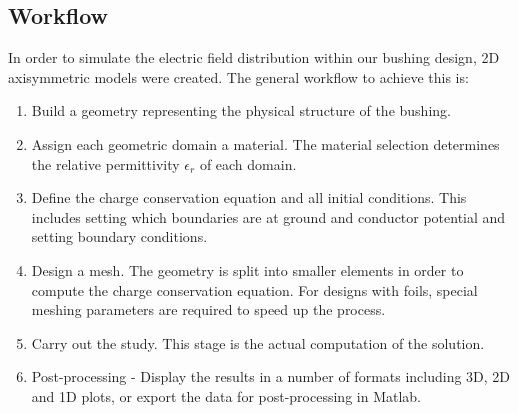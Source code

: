 \subsection{Workflow}
In order to simulate the electric field distribution within our bushing design, 2D axisymmetric models were created. The general workflow to achieve this is:
\begin{enumerate}
\item Build a geometry representing the physical structure of the bushing.
\item Assign each geometric domain a material. The material selection determines the relative permittivity $\epsilon_r$ of each domain.
\item Define the charge conservation equation and all initial conditions. This includes setting which boundaries are at ground and conductor potential and setting boundary conditions.
\item Design a mesh. The geometry is split into smaller elements in order to compute the charge conservation equation. For designs with foils, special meshing parameters are required to speed up the process.
\item Carry out the study. This stage is the actual computation of the solution.
\item Post-processing - Display the results in a number of formats including 3D, 2D and 1D plots, or export the data for post-processing in Matlab.
\end{enumerate}


